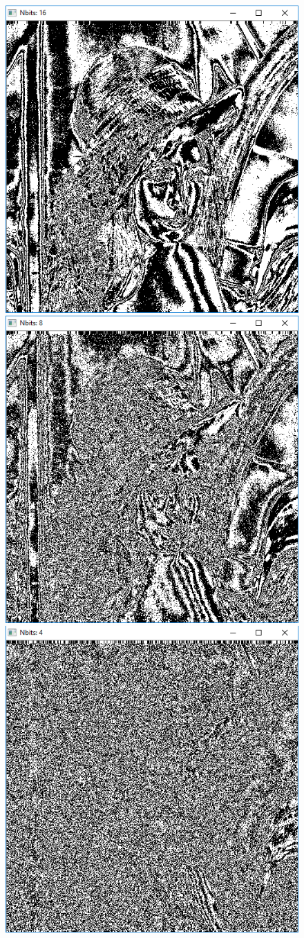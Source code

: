 \documentclass[12pt,a4paper]{article}
\begin{document}
\begin{figure}[h]
\begin{minipage}{0.4\linewidth}
  \end{minipage} 
  \begin{minipage}{0.4\linewidth}
    \centering
    \includegraphics[width=.6\linewidth]{16} 
  \end{minipage}
  \begin{minipage}{0.4\linewidth}
    \centering
    \includegraphics[width=.6\linewidth]{8} 
  \end{minipage}
  \begin{minipage}{0.4\linewidth}
    \centering
    \includegraphics[width=.6\linewidth]{4} 

\end{minipage}
\end{figure}
\end{document}
